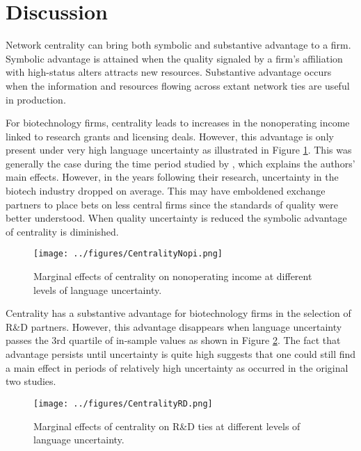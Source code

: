 \section{Discussion}

Network centrality can bring both symbolic and substantive advantage to a firm. Symbolic advantage is attained when the quality signaled by a firm's affiliation with high-status alters attracts new resources. Substantive advantage occurs when the information and resources flowing across extant network ties are useful in production. 

For biotechnology firms, centrality leads to increases in the nonoperating income linked to research grants and licensing deals. However, this advantage is only present under very high language uncertainty as illustrated in Figure \ref{cnopi}. This was generally the case during the time period studied by \citet{powell1999}, which explains the authors' main effects. However, in the years following their research, uncertainty in the biotech industry dropped on average. This may have emboldened exchange partners to place bets on less central firms since the standards of quality were better understood. When quality uncertainty is reduced the symbolic advantage of centrality is diminished.

\begin{figure}
\begin{center}
\texttt{[image: ../figures/CentralityNopi.png]}
\caption[Marginal effects of centrality on nonop. income]{Marginal effects of centrality on nonoperating income at different levels of language uncertainty.\label{cnopi}}
\end{center}
\end{figure}

Centrality has a substantive advantage for biotechnology firms in the selection of R\&D partners. However, this advantage disappears when language uncertainty passes the 3rd quartile of in-sample values as shown in Figure \ref{crd}. The fact that advantage persists until uncertainty is quite high suggests that one could still find a main effect in periods of relatively high uncertainty as occurred in the original two studies.

\begin{figure}
\begin{center}
\texttt{[image: ../figures/CentralityRD.png]}
\caption[Marginal effects of centrality on R\&D]{Marginal effects of centrality on R\&D ties at different levels of language uncertainty.\label{crd}}
\end{center}
\end{figure}

